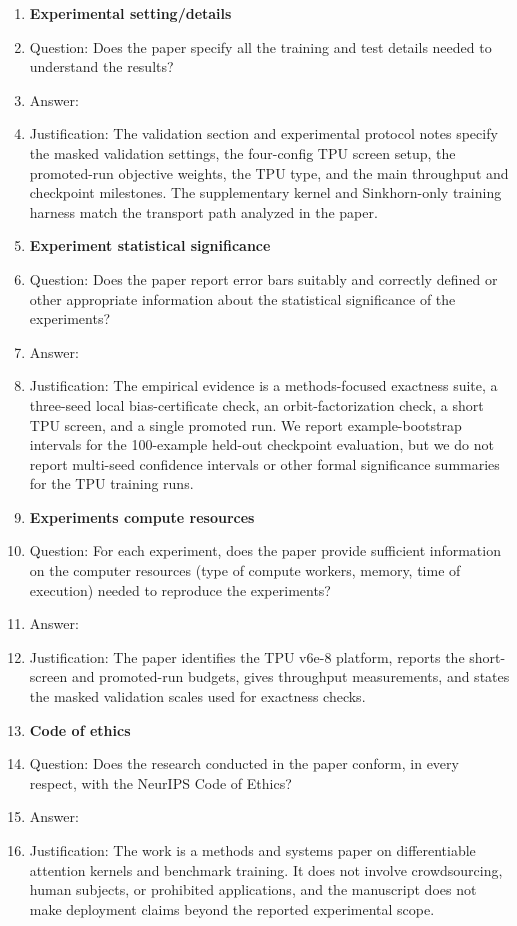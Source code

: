 \begin{enumerate}
\item {\bf Experimental setting/details}
    \item[] Question: Does the paper specify all the training and test details needed to understand the results?
    \item[] Answer: \answerYes{}
    \item[] Justification: The validation section and experimental protocol notes specify the masked validation settings, the four-config TPU screen setup, the promoted-run objective weights, the TPU type, and the main throughput and checkpoint milestones. The supplementary kernel and Sinkhorn-only training harness match the transport path analyzed in the paper.

\item {\bf Experiment statistical significance}
    \item[] Question: Does the paper report error bars suitably and correctly defined or other appropriate information about the statistical significance of the experiments?
    \item[] Answer: \answerNo{}
    \item[] Justification: The empirical evidence is a methods-focused exactness suite, a three-seed local bias-certificate check, an orbit-factorization check, a short TPU screen, and a single promoted run. We report example-bootstrap intervals for the 100-example held-out checkpoint evaluation, but we do not report multi-seed confidence intervals or other formal significance summaries for the TPU training runs.

\item {\bf Experiments compute resources}
    \item[] Question: For each experiment, does the paper provide sufficient information on the computer resources (type of compute workers, memory, time of execution) needed to reproduce the experiments?
    \item[] Answer: \answerYes{}
    \item[] Justification: The paper identifies the TPU v6e-8 platform, reports the short-screen and promoted-run budgets, gives throughput measurements, and states the masked validation scales used for exactness checks.

\item {\bf Code of ethics}
    \item[] Question: Does the research conducted in the paper conform, in every respect, with the NeurIPS Code of Ethics?
    \item[] Answer: \answerYes{}
    \item[] Justification: The work is a methods and systems paper on differentiable attention kernels and benchmark training. It does not involve crowdsourcing, human subjects, or prohibited applications, and the manuscript does not make deployment claims beyond the reported experimental scope.


\end{enumerate}
